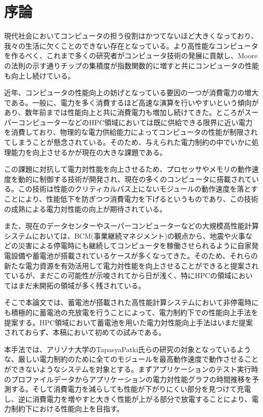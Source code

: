 \chapter{序論}

現代社会においてコンピュータの担う役割はかつてないほど大きくなっており、我々の生活に欠くことのできない存在となっている。より高性能なコンピュータを作るべく、これまで多くの研究者がコンピュータ技術の発展に貢献し、Mooreの法則\cite{mooreslaw}の示す通りチップの集積度が指数関数的に増すと共にコンピュータの性能も向上し続けている。

近年、コンピュータの性能向上の妨げとなっている要因の一つが消費電力の増大である。一般に、電力を多く消費するほど高速な演算を行いやすいという傾向があり、数年前までは性能向上と共に消費電力も増加し続けてきた。ところがスーパーコンピューターなどのHPC領域においては既に供給できる限界に近い電力を消費しており、物理的な電力供給能力によってコンピュータの性能が制限されてしまうことが懸念されている。そのため、与えられた電力制約の中でいかに処理能力を向上させるかが現在の大きな課題である。

この課題に対抗して電力対性能を向上させるため、プロセッサやメモリの動作速度を動的に制御する技術が開発され、現在の多くのコンピュータに搭載されている。この技術は性能のクリティカルパス上にないモジュールの動作速度を落とすことにより、性能低下を防ぎつつ消費電力を下げるというものであり、この技術の成熟による電力対性能の向上が期待されている。

また、現在のデータセンターやスーパーコンピューターなどの大規模高性能計算システムにおいては、BCM(事業継続マネジメント)の観点から、地震や火事などの災害による停電時にも継続してコンピュータを稼働させられるように自家発電設備や蓄電池が搭載されているケースが多くなってきた。そのため、それらの新たな電力資源を有効活用して電力対性能を向上させることができると提案されている\cite{Govindan:2011:BLT:2024723.2000105}が、まだこの可能性が示唆されてから日が浅く、特にHPCの領域においてはまだ未開拓の領域が多く残されている。

そこで本論文では、蓄電池が搭載された高性能計算システムにおいて非停電時にも積極的に蓄電池の充放電を行うことによって、電力制約下での性能向上手法を提案する。HPC領域において蓄電池を用いた電力対性能向上手法はいまだ提案されておらず、本稿において初めての試みである。

本手法では、アリゾナ大学のTapasyaPatki氏らの研究\cite{Patki:2013:EHO:2464996.2465009}の対象となっているような、厳しい電力制約のために全てのモジュールを最高動作速度で動作させることができないようなシステムを対象とする。まずアプリケーションのテスト実行時のプロファイルデータからアプリケーションの電力対性能グラフの時間推移を予測する。そして消費電力を減らしても性能が下がりにくい部分を見つけて充電し、逆に消費電力を増やすと大きく性能が上がる部分で放電することにより、電力制約下における性能向上を目指す。

